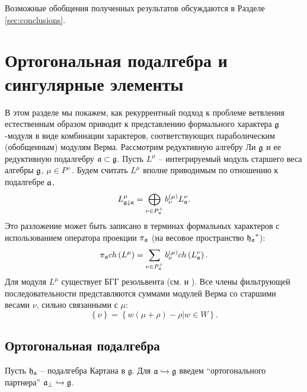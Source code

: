 Возможные обобщения полученных результатов обсуждаются в Разделе \ref{sec:conclusions}.

\section{Ортогональная подалгебра и сингулярные элементы}

\label{sec:recurr-form-branch}

В этом разделе мы покажем, как рекуррентный подход к проблеме ветвления естественным образом приводит к представлению формального характера $\frak{g}$-модуля в виде комбинации характеров, соответствующих параболическим (обобщенным) модулям Верма. Рассмотрим редуктивную алгебру Ли  $\frak{g}$ и ее редуктивную подалгебру $\frak{a}\subset \frak{g}$.
Пусть  $L^{\mu} $ -- интегрируемый модуль старшего веса алгебры  $\frak{g}$, $\mu \in P^{+}$.  Будем считать  $L^{\mu}$ вполне приводимым по отношению к подалгебре $\frak{a}$,
\begin{equation*}
L_{\frak{g}\downarrow \frak{a}}^{\mu }=\bigoplus\limits_{\nu \in P_{\frak{a}%
}^{+}}b_{\nu }^{\left( \mu \right) }L_{\frak{a}}^{\nu }.
\end{equation*}
Это разложение может быть записано в терминах формальных характеров с использованием оператора проекции  $\pi _{\frak{a}}$ (на весовое пространство $\frak{h_{a}}^{\ast }$):
\begin{equation}
\pi _{\frak{a}}ch\left( L^{\mu }\right) =\sum_{\nu \in P_{\frak{a}%
}^{+}}b_{\nu }^{(\mu )}ch\left( L_{\frak{a}}^{\nu }\right) .
\label{branching12}
\end{equation}
Для модуля  $L^{\mu }$ существует БГГ резольвента (см. \cite
{bernstein1976category,bernstein1975differential,bernstein1971structure} и
\cite{humphreys2008representations}). Все члены фильтрующей последовательности представляются суммами модулей Верма со старшими весами $\nu$, сильно связанными с $\mu$:
\begin{equation*}
\left\{ \nu \right\} =\left\{ w\left( \mu +\rho \right) -\rho |w\in
W\right\} .
\end{equation*}

\subsection{Ортогональная подалгебра}

Пусть  $\frak{h}_{\frak{a}}$ -- подалгебра Картана в  $\mathfrak{g}$. Для  $\mathfrak{a}\hookrightarrow \frak{g}$ введем ``ортогонального партнера''  $\mathfrak{a}_{\bot }\hookrightarrow \frak{g}$.


